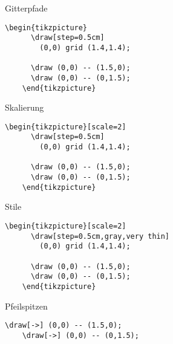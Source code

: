 \begin{Frame}[t,fragile]{Gitterpfade}

  \xxx

  \begin{lstlisting}[gobble=4]
    \begin{tikzpicture}
      \draw[step=0.5cm]
        (0,0) grid (1.4,1.4);
    
      \draw (0,0) -- (1.5,0);
      \draw (0,0) -- (0,1.5);
    \end{tikzpicture}
  \end{lstlisting}
\end{Frame}

\begin{Frame}[t,fragile]{Skalierung}

  \xxx

  \begin{lstlisting}[gobble=4]
    \begin{tikzpicture}[scale=2]
      \draw[step=0.5cm]
        (0,0) grid (1.4,1.4);
    
      \draw (0,0) -- (1.5,0);
      \draw (0,0) -- (0,1.5);
    \end{tikzpicture}
  \end{lstlisting}
\end{Frame}

\begin{Frame}[t,fragile]{Stile}

  \xxx

  \begin{lstlisting}[gobble=4]
    \begin{tikzpicture}[scale=2]
      \draw[step=0.5cm,gray,very thin]
        (0,0) grid (1.4,1.4);
    
      \draw (0,0) -- (1.5,0);
      \draw (0,0) -- (0,1.5);
    \end{tikzpicture}
  \end{lstlisting}
\end{Frame}

\begin{Frame}[t,fragile]{Pfeilspitzen}

  \xxx

  \begin{lstlisting}[gobble=4]
    \draw[->] (0,0) -- (1.5,0);
    \draw[->] (0,0) -- (0,1.5);
  \end{lstlisting}
\end{Frame}

